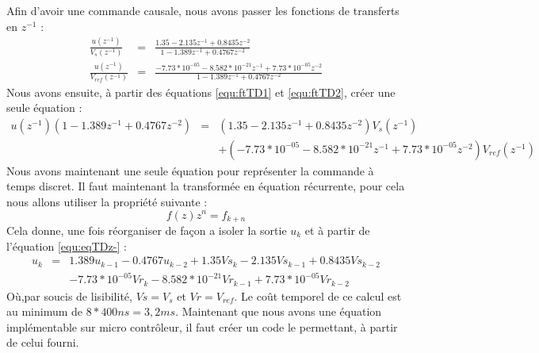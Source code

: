 
Afin d'avoir une commande causale, nous avons passer les fonctions de transferts en $z^{-1}$ :
\begin{eqnarray}
\label{equ:ftTD1}\frac{u(z^{-1})}{V_s(z^{-1})} &=& \frac{1.35  - 2.135 z^{-1} + 0.8435 z^{-2}}{    1 - 1.389 z^{-1} + 0.4767 z^{-2}}\\
\label{equ:ftTD2}\frac{u(z^{-1})}{V_{ref}(z^{-1})}	&=&	\frac{-7.73*10^{-05} - 8.582*10^{-21} z^{-1} + 7.73*10^{-05} z^{-2}}{    1 - 1.389 z^{-1} + 0.4767 z^{-2}}
\end{eqnarray}
Nous avons ensuite, à partir des équations \ref{equ:ftTD1} et  \ref{equ:ftTD2}, créer une seule équation :
\begin{equation}
\label{equ:eqTDz-}
\begin{array}{lcl}
u(z^{-1})(1 - 1.389 z^{-1} + 0.4767 z^{-2}) &=& (1.35  - 2.135 z^{-1} + 0.8435 z^{-2})  V_s(z^{-1}) \\
&&+ (-7.73*10^{-05} - 8.582*10^{-21} z^{-1} + 7.73*10^{-05} z^{-2})V_{ref}(z^{-1})
\end{array}
\end{equation}
Nous avons maintenant une seule équation pour représenter la commande à temps discret.%
Il faut maintenant la transformée en équation récurrente, pour cela nous allons utiliser la propriété suivante :
\begin{equation}
f(z)z^n = f_{k+n}
\end{equation}
Cela donne, une fois réorganiser de façon a isoler la sortie $u_k$ et à partir de l'équation \ref{equ:eqTDz-} :
\begin{equation}
\begin{array}{lcl}
u_k &=&  1.389 u_{k-1} - 0.4767 u_{k-2} + 1.35Vs_{k}  - 2.135 Vs_{k-1} + 0.8435 Vs_{k-2}  \\
&& -7.73*10^{-05}Vr_k - 8.582*10^{-21} Vr_{k-1} + 7.73*10^{-05} Vr_{k-2}
\end{array}
\end{equation}
Où,par soucis de lisibilité, $Vs = V_s$ et $Vr = V_{ref}$.
Le coût temporel de ce calcul est au minimum de $8*400ns = 3,2 ms$.
Maintenant que nous avons une équation implémentable sur micro contrôleur, il faut créer un code le permettant, à partir de celui fourni.
